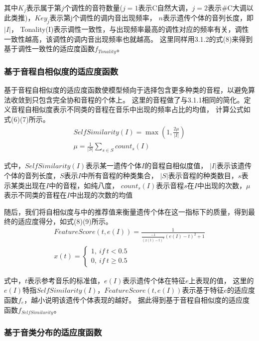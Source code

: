 \documentclass{article}
\begin{document}
其中$K_j$表示属于第$j$个调性的音符数量($j=1$表示C自然大调，$j=2$表示\#C大调以此类推)，$Key_j$表示第j个调性的调内音出现频率，
$n$表示遗传个体的音列长度，即$|I|$，
Tonality(I)表示调性一致性，与出现频率最高的调性对应的频率有关，调性一致性越高，该调性的调内音出现频率也就越高。
这里同样用3.1.2的式(8)来得到基于调性一致性的适应度函数$f_{Tonality}$。

\subsubsection{基于音程自相似度的适应度函数}

基于音程自相似度的适应度函数使模型倾向于选择包含更多种类的音程，以避免算法收敛到只包含完全协和音程的个体上。
这里的音程做了与3.1.1相同的简化。定义音程自相似度表示不同类的音程在音乐中出现的频率占比的均值，
计算公式如式(6)(7)所示。
\begin{gather}
    SelfSimilarity(I)=\max(1, \frac{2\mu}{|I|})\\
    \mu=\frac{1}{|S|}\sum_{s\in S} count_s(I)
\end{gather}

式中，$SelfSimilarity(I)$表示某一遗传个体$I$的音程自相似度值，
$|I|$表示该遗传个体的音列长度，$S$表示$I$中所有音程的种类集合，
$|S|$表示音程的种类数目，$s$表示某类出现在$I$中的音程，如纯八度，
$count_s(I)$表示音程$s$在$I$中出现的次数，$\mu$表示不同类的音程在$I$中出现的次数的均值

随后，我们将自相似度与\cite{article1}中的推荐值来衡量遗传个体在这一指标下的质量，得到最终的适应度得分，如式(8)(9)所示。
\begin{gather}
    FeatureScore(t,e(I))=\frac{1}{\frac{-1}{(x(t)-t)^2}(e(I)-t)^2+1}\\
    x(t)=\left\{\begin{matrix}
        1,\ if\ t<0.5\\ 
        0,\ if\ t\geq 0.5
        \end{matrix}\right.
\end{gather}

式中，$t$表示参考音乐的标准值，$e(I)$表示遗传个体在特征$e$上表现的值，
这里的$e(I)$特指$SelfSimilarity(I)$，$FeatureScore(t,e(I))$表示基于特征$e$的适应度函数$f_e$，越小说明该遗传个体表现的越好。
据此得到基于音程自相似度的适应度函数$f_{SelfSimilarity}$。

\subsubsection{基于音类分布的适应度函数}
\end{document}
